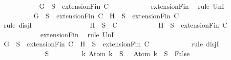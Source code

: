 \begin{isabellebody}
\ \ \ \ \ \ \ \ \isamarkupfalse%
\ \isamarkupfalse%
\ {\isachardoublequoteopen}{\isacharbraceleft}G{\isacharbraceright}\ {\isasymunion}\ S\ {\isasymin}\ {\isacharparenleft}extensionFin\ C{\isacharparenright}{\isachardoublequoteclose}\isanewline
\ \ \ \ \ \ \ \ \ \ \isamarkupfalse%
\ extensionFin\ \isamarkupfalse%
\ {\isacharparenleft}rule\ UnI{}{\isacharparenright}\isanewline
\ \ \ \ \ \ \ \ \isamarkupfalse%
\ {\isachardoublequoteopen}{\isacharbraceleft}G{\isacharbraceright}\ {\isasymunion}\ S\ {\isasymin}\ {\isacharparenleft}extensionFin\ C{\isacharparenright}\ {\isasymor}\ {\isacharbraceleft}H{\isacharbraceright}\ {\isasymunion}\ S\ {\isasymin}\ {\isacharparenleft}extensionFin\ C{\isacharparenright}{\isachardoublequoteclose}\isanewline
\ \ \ \ \ \ \ \ \ \ \isamarkupfalse%
\ {\isacharparenleft}rule\ disjI{}{\isacharparenright}\isanewline
\ \ \ \ \ \ \isamarkupfalse%
\isanewline
\ \ \ \ \ \ \ \ \isamarkupfalse%
\ {\isachardoublequoteopen}{\isacharbraceleft}H{\isacharbraceright}\ {\isasymunion}\ S\ {\isasymin}\ C{\isachardoublequoteclose}\isanewline
\ \ \ \ \ \ \ \ \isamarkupfalse%
\ \isamarkupfalse%
\ {\isachardoublequoteopen}{\isacharbraceleft}H{\isacharbraceright}\ {\isasymunion}\ S\ {\isasymin}\ {\isacharparenleft}extensionFin\ C{\isacharparenright}{\isachardoublequoteclose}\isanewline
\ \ \ \ \ \ \ \ \ \ \isamarkupfalse%
\ extensionFin\ \isamarkupfalse%
\ {\isacharparenleft}rule\ UnI{}{\isacharparenright}\isanewline
\ \ \ \ \ \ \ \ \isamarkupfalse%
\ {\isachardoublequoteopen}{\isacharbraceleft}G{\isacharbraceright}\ {\isasymunion}\ S\ {\isasymin}\ {\isacharparenleft}extensionFin\ C{\isacharparenright}\ {\isasymor}\ {\isacharbraceleft}H{\isacharbraceright}\ {\isasymunion}\ S\ {\isasymin}\ {\isacharparenleft}extensionFin\ C{\isacharparenright}{\isachardoublequoteclose}\isanewline
\ \ \ \ \ \ \ \ \ \ \isamarkupfalse%
\ {\isacharparenleft}rule\ disjI{}{\isacharparenright}\isanewline
\ \ \ \ \ \ \isamarkupfalse%
\isanewline
\ \ \ \ \isamarkupfalse%
\isanewline
\ \ \isamarkupfalse%
\isanewline
\ \ \isamarkupfalse%
\ {\isachardoublequoteopen}{\isasymbottom}\ {\isasymnotin}\ S\ {\isasymand}\isanewline
\ \ \ \ \ \ \ \ {\isacharparenleft}{\isasymforall}k{\isachardot}\ Atom\ k\ {\isasymin}\ S\ {\isasymlongrightarrow}\ \isactrlbold {\isasymnot}\ {\isacharparenleft}Atom\ k{\isacharparenright}\ {\isasymin}\ S\ {\isasymlongrightarrow}\ False{\isacharparenright}\ {\isasymand}\isanewline

\end{isabellebody}
